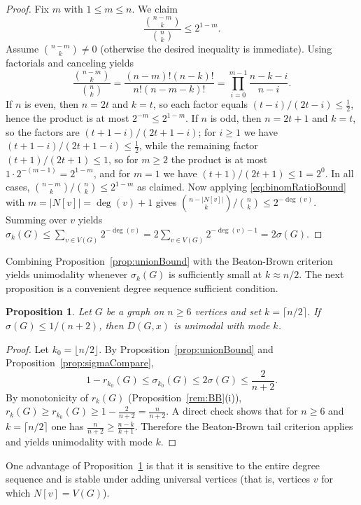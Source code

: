 \documentclass[11pt]{amsart}
\newtheorem{proposition}[theorem]{Proposition}
\numberwithin{equation}{section}
\newcommand{\VV}{V(G)}
\begin{document}
\begin{proof}
Fix $m$ with $1\le m\le n$. We claim
\begin{equation}\label{eq:binomRatioBound}
\frac{\binom{n-m}{k}}{\binom{n}{k}}\le 2^{1-m}.
\end{equation}
Assume $\binom{n-m}{k}\neq 0$ (otherwise the desired inequality is immediate). Using factorials and canceling yields
\[
\frac{\binom{n-m}{k}}{\binom{n}{k}}
=\frac{(n-m)!(n-k)!}{n!(n-m-k)!}
=\prod_{i=0}^{m-1}\frac{n-k-i}{\,n-i\,}.
\]
If $n$ is even, then $n=2t$ and $k=t$, so each factor equals $(t-i)/(2t-i)\le \tfrac12$, hence the product is at most $2^{-m}\le 2^{1-m}$. If $n$ is odd, then $n=2t+1$ and $k=t$, so the factors are $(t+1-i)/(2t+1-i)$; for $i\ge 1$ we have $(t+1-i)/(2t+1-i)\le \tfrac12$, while the remaining factor $(t+1)/(2t+1)\le 1$, so for $m\ge 2$ the product is at most $1\cdot 2^{-(m-1)}=2^{1-m}$, and for $m=1$ we have $(t+1)/(2t+1)\le 1=2^{0}$. In all cases, $\binom{n-m}{k}/\binom{n}{k}\le 2^{1-m}$ as claimed. Now applying \eqref{eq:binomRatioBound} with $m=|N[v]|=\deg(v)+1$ gives $\binom{n-|N[v]|}{k}/\binom{n}{k} \le 2^{-\deg(v)}$. Summing over $v$ yields $\sigma_k(G)\le \sum_{v \in \VV} 2^{-\deg(v)}=2\sum_{v \in \VV} 2^{-\deg(v)-1}=2\sigma(G)$.
\end{proof}

Combining Proposition~\ref{prop:unionBound} with the Beaton-Brown criterion yields unimodality whenever $\sigma_k(G)$ is sufficiently small at $k\approx n/2$. The next proposition is a convenient degree sequence sufficient condition.

\begin{proposition}\label{prop:sigmaCriterion}
Let $G$ be a graph on $n\ge 6$ vertices and set $k=\lceil n/2\rceil$. If $\sigma(G)\le 1/(n+2)$, then $D(G,x)$ is unimodal with mode $k$.
\end{proposition}

\begin{proof}
Let $k_0=\lfloor n/2\rfloor$. By Proposition~\ref{prop:unionBound} and Proposition~\ref{prop:sigmaCompare},
\[
1-r_{k_0}(G)\le \sigma_{k_0}(G)\le 2\sigma(G)\le \frac{2}{n+2}.
\]
By monotonicity of $r_k(G)$ (Proposition~\ref{rem:BB}(i)), $r_k(G)\ge r_{k_0}(G)\ge 1-\frac{2}{n+2}=\frac{n}{n+2}$. A direct check shows that for $n\ge 6$ and $k=\lceil n/2\rceil$ one has $\frac{n}{n+2}\ge \frac{n-k}{k+1}$. Therefore the Beaton-Brown tail criterion applies and yields unimodality with mode $k$.
\end{proof}

One advantage of Proposition~\ref{prop:sigmaCriterion} is that it is sensitive to the entire degree sequence and is stable under adding universal vertices (that is, vertices $v$ for which $N[v]=\VV$).
\end{document}

